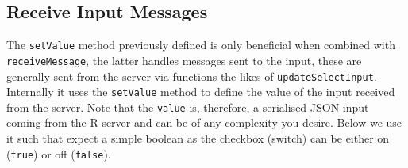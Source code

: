 \documentclass[
  10pt,
]{krantz}
\makeatletter
\newenvironment{Shaded}{\begin{snugshade}}{\end{snugshade}}
\newcommand{\AttributeTok}[1]{\textcolor[rgb]{0.61,0.61,0.61}{#1}}
\newcommand{\CommentTok}[1]{\textcolor[rgb]{0.37,0.37,0.37}{\textit{#1}}}
\newcommand{\ControlFlowTok}[1]{\textcolor[rgb]{0.27,0.27,0.27}{\textbf{#1}}}
\newcommand{\DataTypeTok}[1]{\textcolor[rgb]{0.27,0.27,0.27}{#1}}
\newcommand{\KeywordTok}[1]{\textcolor[rgb]{0.27,0.27,0.27}{\textbf{#1}}}
\newcommand{\NormalTok}[1]{#1}
\newcommand{\OperatorTok}[1]{\textcolor[rgb]{0.43,0.43,0.43}{\textbf{#1}}}
\newcommand{\StringTok}[1]{\textcolor[rgb]{0.5,0.5,0.5}{#1}}
\newcommand{\VariableTok}[1]{\textcolor[rgb]{0,0,0}{#1}}
\newenvironment{kframe}{%
\medskip{}
\setlength{\fboxsep}{.8em}
 \def\at@end@of@kframe{}%
 \ifinner\ifhmode%
  \def\at@end@of@kframe{\end{minipage}}%
  \begin{minipage}{\columnwidth}%
 \fi\fi%
 \def\FrameCommand##1{\hskip\@totalleftmargin \hskip-\fboxsep
 \colorbox{shadecolor}{##1}\hskip-\fboxsep
     \hskip-\linewidth \hskip-\@totalleftmargin \hskip\columnwidth}%
 \MakeFramed {\advance\hsize-\width
   \@totalleftmargin\z@ \linewidth\hsize
   \@setminipage}}%
 {\par\unskip\endMakeFramed%
 \at@end@of@kframe}
\renewenvironment{Shaded}{\begin{kframe}}{\end{kframe}}
\makeatother
\begin{document}
\hypertarget{shiny-input-receive-msg}{%
\subsection{Receive Input Messages}\label{shiny-input-receive-msg}}

The \texttt{setValue} method previously defined is only beneficial when combined with \texttt{receiveMessage}, the latter handles messages sent to the input, these are generally sent from the server via functions the likes of \texttt{updateSelectInput}. Internally it uses the \texttt{setValue} method to define the value of the input received from the server. Note that the \texttt{value} is, therefore, a serialised JSON input coming from the R server and can be of any complexity you desire. Below we use it such that expect a simple boolean as the checkbox (switch) can be either on (\texttt{true}) or off (\texttt{false}).

\begin{Shaded}
\end{Shaded}
\end{document}
